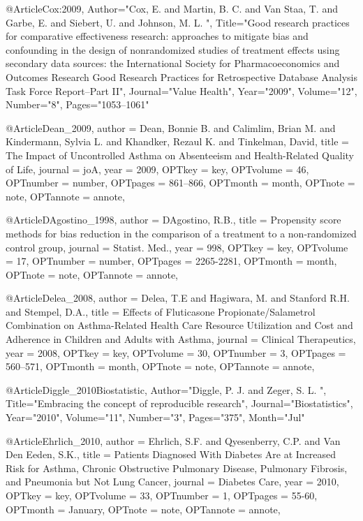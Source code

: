 {{@Article{Cox:2009,
   Author="Cox, E.  and Martin, B. C.  and Van Staa, T.  and Garbe, E.  and Siebert, U.  and Johnson, M. L. ",
   Title="{{G}ood research practices for comparative effectiveness research: approaches to mitigate bias and confounding in the design of nonrandomized studies of treatment effects using secondary data sources: the {I}nternational {S}ociety for {P}harmacoeconomics and {O}utcomes {R}esearch {G}ood {R}esearch {P}ractices for {R}etrospective {D}atabase {A}nalysis {T}ask {F}orce {R}eport--{P}art {I}{I}}",
   Journal="Value Health",
   Year="2009",
   Volume="12",
   Number="8",
   Pages="1053--1061"
}


@Article{Dean_2009,
author = {Dean, Bonnie B. and Calimlim, Brian M. and Kindermann, Sylvia L. and Khandker, Rezaul K. and Tinkelman, David},
title = {The Impact of Uncontrolled Asthma on Absenteeism and Health-Related
Quality of Life},
journal = {joA},
year = {2009},
OPTkey = {key},
OPTvolume = {46},
OPTnumber = {number},
OPTpages = {861–866},
OPTmonth = {month},
OPTnote = {note},
OPTannote = {annote},
}

@Article{DAgostino_1998,
author = {DAgostino, R.B.},
title = {Propensity score methods for bias reduction in the comparison of a treatment to a non-randomized control group},
journal = {Statist. Med.},
year = {998},
OPTkey = {key},
OPTvolume = {17},
OPTnumber = {number},
OPTpages = {2265-2281},
OPTmonth = {month},
OPTnote = {note},
OPTannote = {annote},
}

@Article{Delea_2008,
author = {Delea, T.E and Hagiwara, M. and Stanford R.H. and Stempel, D.A.},
title = {Effects of Fluticasone Propionate/Salametrol Combination on Asthma-Related Health Care Resource Utilization and Cost and Adherence in Children and Adults with Asthma},
journal = {Clinical Therapeutics},
year = {2008},
OPTkey = {key},
OPTvolume = {30},
OPTnumber = {3},
OPTpages = {560–571},
OPTmonth = {month},
OPTnote = {note},
OPTannote = {annote},
}


@Article{Diggle_2010Biostatistic,
   Author="Diggle, P. J.  and Zeger, S. L. ",
   Title="{{E}mbracing the concept of reproducible research}",
   Journal="Biostatistics",
   Year="2010",
   Volume="11",
   Number="3",
   Pages="375",
   Month="Jul"
}

@Article{Ehrlich_2010,
author = {Ehrlich, S.F. and Qyesenberry, C.P. and Van Den Eeden, S.K.},
title = {Patients Diagnosed With Diabetes Are at Increased Risk for Asthma, Chronic Obstructive Pulmonary Disease, Pulmonary Fibrosis, and Pneumonia but Not Lung Cancer},
journal = {Diabetes Care},
year = {2010},
OPTkey = {key},
OPTvolume = {33},
OPTnumber = {1},
OPTpages = {55-60},
OPTmonth = {January},
OPTnote = {note},
OPTannote = {annote},
}

}}
